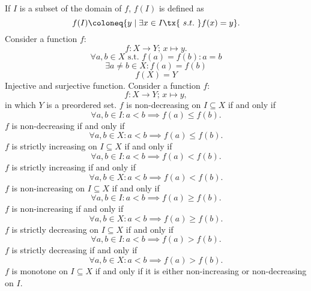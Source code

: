 \documentclass[a4paper,12pt]{report}
\begin{document}
If $I$ is a subset of the domain of $f$, $f(I)$ is defined as
\[f(I)\coloneq\{y\mid\exists x\in I \tx{\ s.t.\ }f(x)=y\}.\]
Consider a function $f$:
\[f\colon X\to Y;\,x\mapsto y.\]
\[\forall a,b\in X\text{\ s.t.\ } f(a)=f(b)\colon a=b\]
\[\exists a\neq b\in X\colon f(a)=f(b)\]
\[f(X)=Y\]
Injective and surjective function.
Consider a function $f$:
\[f\colon X\to Y;\,x\mapsto y,\]
in which $Y$ is a preordered set.
$f$ is non-decreasing on $I\subseteq X$ if and only if
\[\forall a,b\in I\colon a<b\implies f(a)\leq f(b).\]
$f$ is non-decreasing if and only if
\[\forall a,b\in X\colon a<b\implies f(a)\leq f(b).\]
$f$ is strictly increasing on $I\subseteq X$ if and only if
\[\forall a,b\in I\colon a<b\implies f(a)<f(b).\]
$f$ is strictly increasing if and only if
\[\forall a,b\in X\colon a<b\implies f(a)<f(b).\]
$f$ is non-increasing on $I\subseteq X$ if and only if
\[\forall a,b\in I\colon a<b\implies f(a)\geq f(b).\]
$f$ is non-increasing if and only if
\[\forall a,b\in X\colon a<b\implies f(a)\geq f(b).\]
$f$ is strictly decreasing on $I\subseteq X$ if and only if
\[\forall a,b\in I\colon a<b\implies f(a)>f(b).\]
$f$ is strictly decreasing if and only if
\[\forall a,b\in X\colon a<b\implies f(a)>f(b).\]
$f$ is monotone on $I\subseteq X$ if and only if it is either non-increasing or non-decreasing on $I$.
\end{document}
